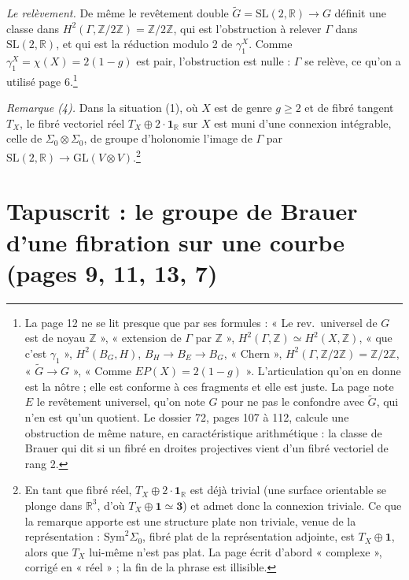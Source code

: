 \documentclass[11pt,a4paper]{article}
\begin{document}
\emph{Le relèvement.} De même le revêtement double $\widetilde{G} =
\mathrm{SL}(2,\mathbb{R}) \to G$ définit une classe dans $H^{2}(\Gamma,
\mathbb{Z}/2\mathbb{Z}) = \mathbb{Z}/2\mathbb{Z}$, qui est l'obstruction à
relever $\Gamma$ dans $\mathrm{SL}(2,\mathbb{R})$, et qui est la réduction
modulo 2 de $\gamma_{1}^{X}$. Comme $\gamma_{1}^{X} = \chi(X) = 2(1-g)$ est
pair, l'obstruction est nulle : $\Gamma$ se relève, ce qu'on a utilisé page
6.\footnote{La page 12 ne se lit presque que par ses formules :
« Le rev.\ universel de $G$ est de noyau $\mathbb{Z}$ », « extension de
$\Gamma$ par $\mathbb{Z}$ », $H^{2}(\Gamma,\mathbb{Z}) \simeq
H^{2}(X,\mathbb{Z})$, « que c'est $\gamma_{1}$ », $H^{2}(B_{G}, H)$,
$B_{H} \to B_{E} \to B_{G}$, « Chern », $H^{2}(\Gamma,\mathbb{Z}/2\mathbb{Z})
= \mathbb{Z}/2\mathbb{Z}$, « $\widetilde{G} \to G$ », « Comme $EP(X) =
2(1-g)$ ». L'articulation qu'on en donne est la nôtre ; elle est conforme à
ces fragments et elle est juste. La page note $E$ le revêtement universel,
qu'on note $\widehat{G}$ pour ne pas le confondre avec $\widetilde{G}$, qui
n'en est qu'un quotient. Le dossier 72, pages 107 à 112, calcule une
obstruction de même nature, en caractéristique arithmétique : la classe de
Brauer qui dit si un fibré en droites projectives vient d'un fibré vectoriel
de rang 2.}

\emph{Remarque (4).} Dans la situation (1), où $X$ est de genre $g \geq 2$ et de
fibré tangent $T_{X}$, le fibré vectoriel réel $T_{X} \oplus 2 \cdot
\mathbf{1}_{\mathbb{R}}$ sur $X$ est muni d'une connexion intégrable, celle
de $\Sigma_{0} \otimes \Sigma_{0}$, de groupe d'holonomie l'image de $\Gamma$
par $\mathrm{SL}(2,\mathbb{R}) \to \mathrm{GL}(V \otimes V)$.\footnote{En tant
que fibré réel, $T_{X} \oplus 2 \cdot \mathbf{1}_{\mathbb{R}}$ est déjà
trivial (une surface orientable se plonge dans $\mathbb{R}^{3}$, d'où
$T_{X} \oplus \mathbf{1} \simeq \mathbf{3}$) et admet donc la connexion
triviale. Ce que la remarque apporte est une structure plate non triviale,
venue de la représentation : $\mathrm{Sym}^{2}\Sigma_{0}$, fibré plat de la
représentation adjointe, est $T_{X} \oplus \mathbf{1}$, alors que $T_{X}$
lui-même n'est pas plat. La page écrit d'abord « complexe », corrigé en
« réel » ; la fin de la phrase est illisible.}

\section*{Tapuscrit : le groupe de Brauer d'une fibration sur une courbe (pages 9, 11, 13, 7)}
\end{document}
